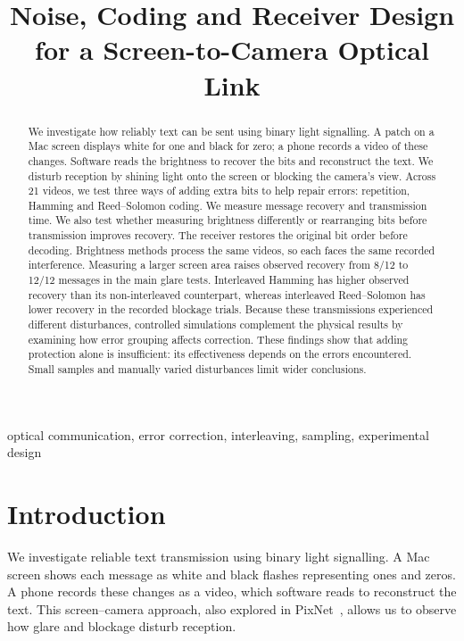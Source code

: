 \documentclass[conference,a4paper]{IEEEtran}
\title{Noise, Coding and Receiver Design\\for a Screen-to-Camera Optical Link}
\author{\IEEEauthorblockN{Riyaadh Gani, Omar Sayed, Adrian Pailler, and Lara Yanc}
\IEEEauthorblockA{University College London\\COMP0228: Sampling, Compression and Data Analysis}}
\begin{document}
\raggedbottom
\setlength{\textfloatsep}{10pt plus 2pt minus 2pt}
\setlength{\floatsep}{8pt plus 2pt minus 2pt}
\maketitle
\begin{abstract}
We investigate how reliably text can be sent using binary light signalling.
A patch on a Mac screen displays white for one and black for zero; a phone
records a video of these changes. Software reads the brightness to recover
the bits and reconstruct the text. We disturb reception by shining light
onto the screen or blocking the camera's view.
Across 21 videos, we test three ways of adding extra bits to help repair
errors: repetition, Hamming and Reed--Solomon coding. We measure message
recovery and transmission time. We also test whether measuring brightness
differently or rearranging bits before transmission improves recovery.
The receiver restores the original bit order before decoding. Brightness
methods process the same videos, so each faces the same recorded interference.
Measuring a larger screen area raises observed recovery from 8/12 to 12/12
messages in the main glare tests. Interleaved Hamming has higher observed
recovery than its non-interleaved counterpart, whereas interleaved
Reed--Solomon has lower recovery in the recorded blockage trials.
Because these transmissions experienced different disturbances, controlled
simulations complement the physical results by examining how error
grouping affects correction. These findings show
that adding protection alone is insufficient: its effectiveness depends
on the errors encountered. Small samples and manually varied disturbances
limit wider conclusions.
\end{abstract}
\begin{IEEEkeywords}
optical communication, error correction, interleaving, sampling, experimental design
\end{IEEEkeywords}

\section{Introduction}
We investigate reliable text transmission using binary light signalling.
A Mac screen shows each message as white and black flashes representing
ones and zeros. A phone records these changes as a video, which software reads
to reconstruct the text. This screen--camera approach,
also explored in PixNet~\cite{pixnet}, allows us to observe how glare and
blockage disturb reception.
\end{document}
